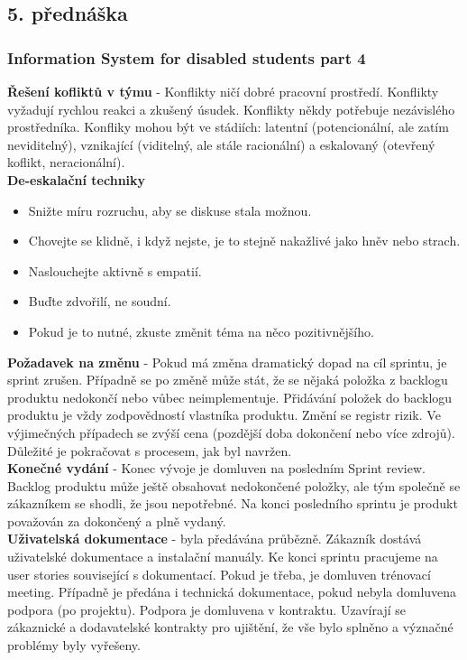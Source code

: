 \documentclass[11pt,a4paper]{article}
\begin{document}
    \subsection{5. přednáška}
    \subsubsection{Information System for disabled students part 4 \cite{pres-5}}
        \textbf{Řešení kofliktů v týmu} - Konflikty ničí dobré pracovní prostředí. Konflikty vyžadují rychlou reakci a zkušený úsudek. Konflikty někdy potřebuje nezávislého prostředníka. Konfliky mohou být ve stádiích: latentní (potencionální, ale zatím neviditelný), vznikající (viditelný, ale stále racionální) a eskalovaný (otevřený koflikt, neracionální).\\
        \textbf{De-eskalační techniky}
        \begin{multicols}{2}
        \begin{itemize}
            \item Snižte míru rozruchu, aby se diskuse stala možnou.
            \item Chovejte se klidně, i když nejste, je to stejně nakažlivé jako hněv nebo strach.
            \item Naslouchejte aktivně s empatií.
            \item Buďte zdvořilí, ne soudní.
            \item Pokud je to nutné, zkuste změnit téma na něco pozitivnějšího.
        \end{itemize}
        \end{multicols}
        \textbf{Požadavek na změnu} - Pokud má změna dramatický dopad na cíl sprintu, je sprint zrušen. Případně se po změně může stát, že se nějaká položka z backlogu produktu nedokončí nebo vůbec neimplementuje. Přidávání položek do backlogu produktu je vždy zodpovědností vlastníka produktu. Změní se registr rizik. Ve výjimečných případech se zvýší cena (pozdější doba dokončení nebo více zdrojů). Důležité je pokračovat s procesem, jak byl navržen.\\
        \textbf{Konečné vydání} - Konec vývoje je domluven na posledním Sprint review. Backlog produktu může ještě obsahovat nedokončené položky, ale tým společně se zákazníkem se shodli, že jsou nepotřebné. Na konci posledního sprintu je produkt považován za dokončený a plně vydaný.\\
        \textbf{Uživatelská dokumentace} - byla předávána průbězně. Zákazník dostává uživatelské dokumentace a instalační manuály. Ke konci sprintu pracujeme na user stories související s dokumentací. Pokud je třeba, je domluven trénovací meeting. Případně je předána i technická dokumentace, pokud nebyla domluvena podpora (po projektu). Podpora je domluvena v kontraktu. Uzavírají se zákaznické a dodavatelské kontrakty pro ujištění, že vše bylo splněno a význačné problémy byly vyřešeny.\\
\end{document}
